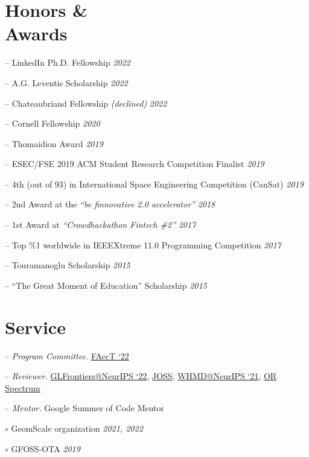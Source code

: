 \documentclass[margin]{res}
\begin{document}
\begin{resume}
\section{Honors \& \\ Awards} 
\begin{compactitem}
	\item[--] LinkedIn Ph.D. Fellowship \hfill \emph{2022} 	
	\item[--] A.G. Leventis Scholarship \hfill \emph{2022}
	\item[--] Chateaubriand Fellowship \emph{(declined)} \hfill \emph{2022}
	\item[--] Cornell Fellowship \hfill \emph{2020}
	\item[--] Thomaidion Award \hfill \emph{2019}
	\item[--] ESEC/FSE 2019 ACM Student Research Competition Finalist \hfill \emph{2019}

	\item[--] 4th (out of 93) in International Space Engineering  Competition (CanSat) \hfill \emph{2019}
    \item[--] 2nd Award at the \emph{``be finnovative 2.0 accelerator''} \hfill \emph{2018}
   	\item[--] 1st Award at \emph{``Crowdhackathon Fintech \#2''} \hfill \emph{2017}
   	\item[--] Top \%1 worldwide in IEEEXtreme 11.0 Programming Competition \hfill \emph{2017}
    \item [--] Touramanoglu Scholarship \hfill \emph{2015}
    \item [--] ``The Great Moment of Education'' Scholarship \hfill \emph{2015}

\end{compactitem}

\section{Service} 
\begin{compactitem}

\item [--] \emph{Program Committee.} \href{https://facctconference.org/2022}{FAccT `22}
\item [--] \emph{Reviewer.} \href{https://glfrontiers.github.io/overview/}{GLFrontiers@NeurIPS `22}, \href{https://joss.theoj.org/}{JOSS}, \href{https://sites.google.com/view/whmd2021}{WHMD@NeurIPS `21},  \href{https://www.springer.com/journal/291?gclid=Cj0KCQiAr5iQBhCsARIsAPcwROPwkZ2Nw4Ubg7i91Y2hITU4OE4lzk_56F09IS09b5wh-sMhuqgft0YaAgATEALw_wcB}{OR Spectrum}
\item [--] \emph{Mentor.} Google Summer of Code Mentor
\begin{compactitem}
	\item [$\circ$] GeomScale organization \hfill \emph{2021, 2022}
	\item [$\circ$] GFOSS-OTA \hfill \emph{2019}
 \end{compactitem}

\end{compactitem}

\end{resume}
\end{document}
